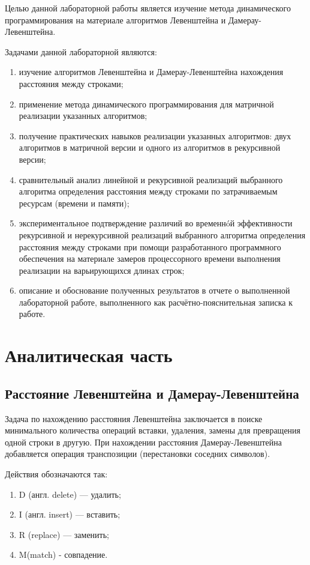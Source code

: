 \documentclass[utf8x, 12pt]{G7-32}
\begin{document}
Целью данной лабораторной работы является изучение метода динамического программирования на материале алгоритмов
Левенштейна и Дамерау-Левенштейна. 

Задачами данной лабораторной являются:
\begin{enumerate}
  	\item изучение алгоритмов Левенштейна и Дамерау-Левенштейна нахождения расстояния между строками;
	\item применение метода динамического программирования для матричной реализации указанных алгоритмов; 
	\item получение практических навыков реализации указанных алгоритмов: двух алгоритмов в матричной версии и одного из алгоритмов в рекурсивной версии; 
	\item сравнительный анализ линейной и рекурсивной реализаций выбранного алгоритма определения расстояния между строками по затрачиваемым ресурсам (времени и памяти); 
	\item экспериментальное подтверждение различий во временнóй эффективности рекурсивной и
нерекурсивной реализаций выбранного алгоритма определения расстояния между строками при
помощи разработанного программного обеспечения на материале замеров процессорного времени
выполнения реализации на варьирующихся длинах строк; 
	\item описание и обоснование полученных результатов в отчете о выполненной лабораторной
работе, выполненного как расчётно-пояснительная записка к работе. 
\end{enumerate}

\mainmatter %
\chapter{Аналитическая часть}
\section{Расстояние Левенштейна и Дамерау-Левенштейна}
Задача по нахождению расстояния Левенштейна заключается в поиске минимального количества операций вставки, удаления, замены для превращения одной строки в другую.
При нахождении расстояния Дамерау-Левенштейна добавляется операция транспозиции (перестановки соседних символов).  

Действия обозначаются так:
\begin{enumerate}
  	\item D (англ. delete) — удалить;
	\item I (англ. insert) — вставить;
	\item R (replace) — заменить;
	\item M(match) - совпадение.
\end{enumerate}
\end{document}
